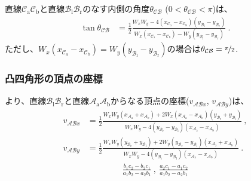 直線$\mathcal C_\mathrm a\mathcal C_\mathrm b$と直線$\mathcal B_\mathrm l\mathcal B_\mathrm r$のなす内側の角度$\theta_{\mathcal{CB}}$ ($0 < \theta_{\mathcal{CB}} < \pi$)は、
\begin{align*}
  \tan\theta_{\mathcal{CB}}
  &= \frac12
     \frac{W_xW_y
           -4\left(x_{\mathcal C_\mathrm a}-x_{\mathcal C_\mathrm b}\right)
             \left(y_{\mathcal B_\mathrm l}-y_{\mathcal B_\mathrm r}\right)}
          {W_x\left(x_{\mathcal C_\mathrm a}-x_{\mathcal C_\mathrm b}\right)
           -W_y\left(y_{\mathcal B_\mathrm l}-y_{\mathcal B_\mathrm r}\right)}\ .
\end{align*}
ただし、$W_x\left(x_{\mathcal C_\mathrm a}-x_{\mathcal C_\mathrm b}\right) = W_y\left(y_{\mathcal B_\mathrm l}-y_{\mathcal B_\mathrm r}\right)$の場合は$\theta_{\mathcal{CB}} = \nicefrac\pi2$.

\clearpage
\subsubsection{凸四角形の頂点の座標}
より、直線$\mathcal B_\mathrm l\mathcal B_\mathrm r$と直線$\mathcal A_\mathrm a\mathcal A_\mathrm b$からなる頂点の座標($v_{\mathcal{AB}x}$, $v_{\mathcal{AB}y}$)は、
\begin{align*}
  v_{\mathcal{AB}x}
  &= \frac12\frac{
       W_xW_y\left(x_{\mathcal A_\mathrm a}+x_{\mathcal A_\mathrm b}\right)
       +2W_x\left(x_{\mathcal A_\mathrm a}-x_{\mathcal A_\mathrm b}\right)\left(y_{\mathcal B_\mathrm r}+y_{\mathcal B_\mathrm l}\right)
     }{
       W_xW_y
       -4\left(y_{\mathcal B_\mathrm r}-y_{\mathcal B_\mathrm l}\right)\left(x_{\mathcal A_\mathrm a}-x_{\mathcal A_\mathrm b}\right)
     }\ ,\\
  v_{\mathcal{AB}y}
  &= \frac12\frac{
       W_xW_y\left(y_{\mathcal B_\mathrm r}+y_{\mathcal B_\mathrm l}\right)
       +2W_y\left(y_{\mathcal B_\mathrm r}-y_{\mathcal B_\mathrm l}\right)\left(x_{\mathcal A_\mathrm a}+x_{\mathcal A_\mathrm b}\right)
     }{
       W_xW_y
       -4\left(y_{\mathcal B_\mathrm r}-y_{\mathcal B_\mathrm l}\right)\left(x_{\mathcal A_\mathrm a}-x_{\mathcal A_\mathrm b}\right)
     }\ .
\end{align*}
\begin{align*}
  \frac{b_1c_2-b_2c_1}{a_1b_2-a_2b_1}~,~
  \frac{a_2c_1-a_1c_2}{a_1b_2-a_2b_1}
\end{align*}

